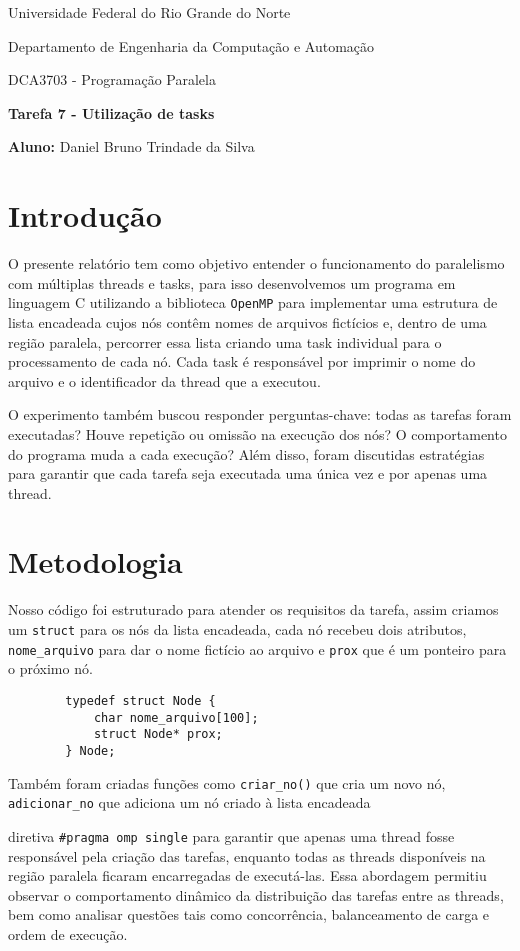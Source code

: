 \documentclass[a4paper, 12pt]{article}
\begin{document}
	\begin{center}
		Universidade Federal do Rio Grande do Norte
		
		Departamento de Engenharia da Computação e Automação
		
		DCA3703 - Programação Paralela
		
		\textbf{Tarefa 7 - Utilização de tasks}
		
		\textbf{Aluno:} Daniel Bruno Trindade da Silva
	\end{center}
	
	\section{Introdução}
	\hspace{.7cm}O presente relatório tem como objetivo entender o funcionamento do paralelismo com múltiplas threads e tasks, para isso desenvolvemos um programa em linguagem C utilizando a biblioteca \texttt{OpenMP} para implementar uma estrutura de lista encadeada cujos nós contêm nomes de arquivos fictícios e, dentro de uma região paralela, percorrer essa lista criando uma task individual para o processamento de cada nó. Cada task é responsável por imprimir o nome do arquivo e o identificador da thread que a executou.
	
	O experimento também buscou responder perguntas-chave: todas as tarefas foram executadas? Houve repetição ou omissão na execução dos nós? O comportamento do programa muda a cada execução? Além disso, foram discutidas estratégias para garantir que cada tarefa seja executada uma única vez e por apenas uma thread.
	
	\section{Metodologia}
	\hspace{.7cm}Nosso código foi estruturado para atender os requisitos da tarefa, assim criamos um \texttt{struct} para os nós da lista encadeada, cada nó recebeu dois atributos, \texttt{nome\_arquivo} para dar o nome fictício ao arquivo e \texttt{prox} que é um ponteiro para o próximo nó.
	
	\begin{verbatim}
		typedef struct Node {
		    char nome_arquivo[100];
		    struct Node* prox;
		} Node;
	\end{verbatim}		

	
	
	
	Também foram criadas funções como \texttt{criar\_no()} que cria um novo nó, \texttt{adicionar\_no} que adiciona um nó criado à lista encadeada
	
	diretiva \texttt{\#pragma omp single} para garantir que apenas uma thread fosse responsável pela criação das tarefas, enquanto todas as threads disponíveis na região paralela ficaram encarregadas de executá-las. Essa abordagem permitiu observar o comportamento dinâmico da distribuição das tarefas entre as threads, bem como analisar questões tais como concorrência, balanceamento de carga e ordem de execução.

	 
	
\end{document}
